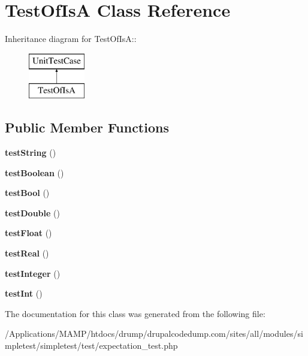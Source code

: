 \hypertarget{class_test_of_is_a}{
\section{TestOfIsA Class Reference}
\label{class_test_of_is_a}
}
Inheritance diagram for TestOfIsA::\begin{figure}[H]
\begin{center}
\leavevmode
\includegraphics[height=2cm]{class_test_of_is_a}
\end{center}
\end{figure}
\subsection*{Public Member Functions}
\begin{DoxyCompactItemize}
\item 
\hypertarget{class_test_of_is_a_aaa38c1304c47a40f9da458a195e1a858}{
{\bfseries testString} ()}
\label{class_test_of_is_a_aaa38c1304c47a40f9da458a195e1a858}

\item 
\hypertarget{class_test_of_is_a_ad83d5bc796464a4b4eb926c3993f7824}{
{\bfseries testBoolean} ()}
\label{class_test_of_is_a_ad83d5bc796464a4b4eb926c3993f7824}

\item 
\hypertarget{class_test_of_is_a_ace7dc837f0ff6ef44416657fc4c172ce}{
{\bfseries testBool} ()}
\label{class_test_of_is_a_ace7dc837f0ff6ef44416657fc4c172ce}

\item 
\hypertarget{class_test_of_is_a_aa11c2b82b71f30abd90d4fa3ab6e42a5}{
{\bfseries testDouble} ()}
\label{class_test_of_is_a_aa11c2b82b71f30abd90d4fa3ab6e42a5}

\item 
\hypertarget{class_test_of_is_a_ad95858a935993c0d366039816dd493fe}{
{\bfseries testFloat} ()}
\label{class_test_of_is_a_ad95858a935993c0d366039816dd493fe}

\item 
\hypertarget{class_test_of_is_a_ac5d2e57644328ae03b5bd97ad56a1f79}{
{\bfseries testReal} ()}
\label{class_test_of_is_a_ac5d2e57644328ae03b5bd97ad56a1f79}

\item 
\hypertarget{class_test_of_is_a_af76b5954557cf3a4a43b5d8cd9c8faa0}{
{\bfseries testInteger} ()}
\label{class_test_of_is_a_af76b5954557cf3a4a43b5d8cd9c8faa0}

\item 
\hypertarget{class_test_of_is_a_ac1299a600601579c77c21c1153fcc353}{
{\bfseries testInt} ()}
\label{class_test_of_is_a_ac1299a600601579c77c21c1153fcc353}

\end{DoxyCompactItemize}


The documentation for this class was generated from the following file:\begin{DoxyCompactItemize}
\item 
/Applications/MAMP/htdocs/drump/drupalcodedump.com/sites/all/modules/simpletest/simpletest/test/expectation\_\-test.php\end{DoxyCompactItemize}

